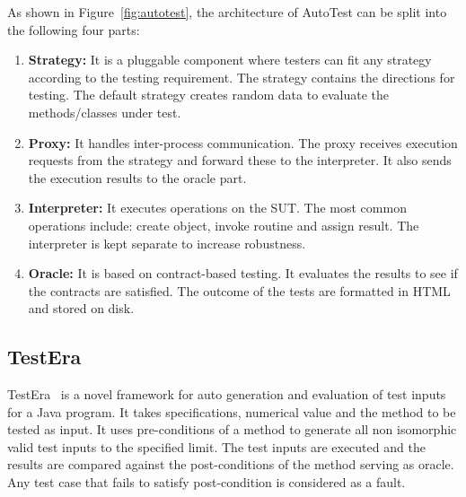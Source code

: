 \noindent As shown in Figure~\ref{fig:autotest}, the architecture of AutoTest can be split into the following four parts:
\begin{enumerate}
\item \textbf{Strategy:} It is a pluggable component where testers can fit any strategy according to the testing requirement. The strategy contains the directions for testing.%
The default strategy creates random data to evaluate the methods/classes under test.
\item \textbf{Proxy:} It handles inter-process communication. The proxy receives execution requests from the strategy and forward these to the interpreter. It also sends the execution results to the oracle part.
\item \textbf{Interpreter:} It executes operations on the SUT. The most common operations include: create object, invoke routine and assign result. The interpreter is kept separate to increase robustness.
\item \textbf{Oracle:} It is based on contract-based testing. It evaluates the results to see if the contracts are satisfied. The outcome of the tests are formatted in HTML and stored on disk.
\end{enumerate}

\subsection{TestEra}
TestEra~\cite{marinov2001testera} is a novel framework for auto generation and evaluation of test inputs for a Java program. It takes specifications, numerical value and the method to be tested as input. It uses pre-conditions of a method to generate all non isomorphic valid test inputs to the specified limit. The test inputs are executed and the results are compared against the post-conditions of the method serving as oracle. Any test case that fails to satisfy post-condition is considered as a fault. 

